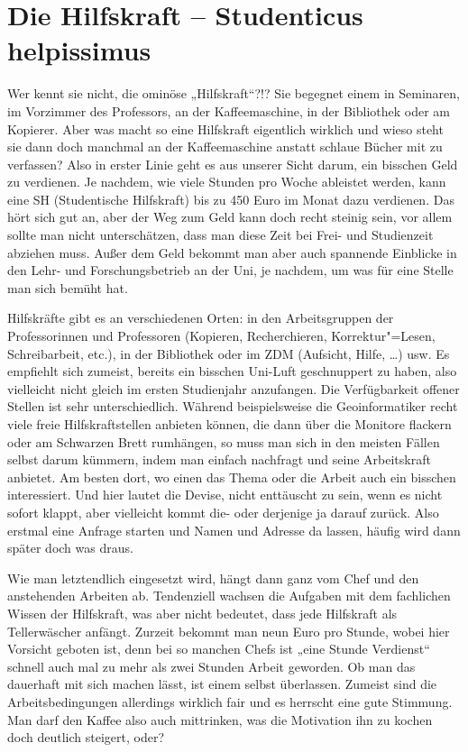 \section{Die Hilfskraft – Studenticus helpissimus}
Wer kennt sie nicht, die ominöse „Hilfskraft“?!? Sie begegnet einem in Seminaren, im Vorzimmer des Professors, an der Kaffeemaschine, in der Bibliothek oder am Kopierer. Aber was macht so eine Hilfskraft eigentlich wirklich und wieso steht sie dann doch manchmal an der Kaffeemaschine anstatt schlaue Bücher mit zu verfassen? Also in erster Linie geht es aus unserer Sicht darum, ein bisschen Geld zu verdienen. Je nachdem, wie viele Stunden pro Woche ableistet werden, kann eine SH (Studentische Hilfskraft) bis zu 450 Euro im Monat dazu verdienen. Das hört sich gut an, aber der Weg zum Geld kann doch recht steinig sein, vor allem sollte man nicht unterschätzen, dass man diese Zeit bei Frei- und Studienzeit abziehen muss. Außer dem Geld bekommt man aber auch spannende Einblicke in den Lehr- und Forschungsbetrieb an der Uni, je nachdem, um was für eine Stelle man sich bemüht hat.\par
Hilfskräfte gibt es an verschiedenen Orten: in den Arbeitsgruppen der Professorinnen und Professoren (Kopieren, Recherchieren, Korrektur"=Lesen, Schreibarbeit, etc.), in der Bibliothek oder im ZDM (Aufsicht, Hilfe, …) usw. Es empfiehlt sich zumeist, bereits ein bisschen Uni-Luft geschnuppert zu haben, also vielleicht nicht gleich im ersten Studienjahr anzufangen. Die Verfügbarkeit offener Stellen ist sehr unterschiedlich. Während beispielsweise die Geoinformatiker recht viele freie Hilfskraftstellen anbieten können, die dann über die Monitore flackern oder am Schwarzen Brett rumhängen, so muss man sich in den meisten Fällen selbst darum kümmern, indem man einfach nachfragt und seine Arbeitskraft anbietet. Am besten dort, wo einen das Thema oder die Arbeit auch ein bisschen interessiert. Und hier lautet die Devise, nicht enttäuscht zu sein, wenn es nicht sofort klappt, aber vielleicht kommt die- oder derjenige ja darauf zurück. Also erstmal eine Anfrage starten und Namen und Adresse da lassen, häufig wird dann später doch was draus. 
\par
Wie man letztendlich eingesetzt wird, hängt dann ganz vom Chef und den anstehenden Arbeiten ab. Tendenziell wachsen die Aufgaben mit dem fachlichen Wissen der Hilfskraft, was aber nicht bedeutet, dass jede Hilfskraft als Tellerwäscher anfängt. Zurzeit bekommt man neun Euro pro Stunde, wobei hier Vorsicht geboten ist, denn bei so manchen Chefs ist „eine Stunde Verdienst“ schnell auch mal zu mehr als zwei Stunden Arbeit geworden. Ob man das dauerhaft mit sich machen lässt, ist einem selbst überlassen. Zumeist sind die Arbeitsbedingungen allerdings wirklich fair und es herrscht eine gute Stimmung. Man darf den Kaffee also auch mittrinken, was die Motivation ihn zu kochen doch deutlich steigert, oder? \par
